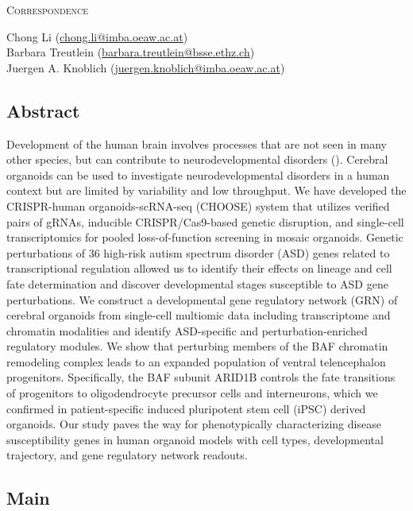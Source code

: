 \noindent
{\large\textsc{Correspondence}} 

\noindent
Chong Li (\href{mailto:chong.li@imba.oeaw.ac.at}{chong.li@imba.oeaw.ac.at})\\
Barbara Treutlein (\href{mailto:barbara.treutlein@bsse.ethz.ch}{barbara.treutlein@bsse.ethz.ch})\\
Juergen A. Knoblich (\href{mailto:juergen.knoblich@imba.oeaw.ac.at}{juergen.knoblich@imba.oeaw.ac.at})

\clearpage



\subsection{Abstract}
Development of the human brain involves processes that are not seen in many other species, but can contribute to neurodevelopmental disorders (\cite{hu_diverse_2014,klingler_mapping_2021,libe-philippot_cellular_2021,lui_development_2011}). Cerebral organoids can be used to investigate neurodevelopmental disorders in a human context but are limited by variability and low throughput. We have developed the CRISPR-human organoids-scRNA-seq (CHOOSE) system that utilizes verified pairs of gRNAs, inducible CRISPR/Cas9-based genetic disruption, and single-cell transcriptomics for pooled loss-of-function screening in mosaic organoids. Genetic perturbations of 36 high-risk autism spectrum disorder (ASD) genes related to transcriptional regulation allowed us to identify their effects on lineage and cell fate determination and discover developmental stages susceptible to ASD gene perturbations. We construct a developmental gene regulatory network (GRN) of cerebral organoids from single-cell multiomic data including transcriptome and chromatin modalities and identify ASD-specific and perturbation-enriched regulatory modules. We show that perturbing members of the BAF chromatin remodeling complex leads to an expanded population of ventral telencephalon progenitors. Specifically, the BAF subunit ARID1B controls the fate transitions of progenitors to oligodendrocyte precursor cells and interneurons, which we confirmed in patient-specific induced pluripotent stem cell (iPSC) derived organoids. Our study paves the way for phenotypically characterizing disease susceptibility genes in human organoid models with cell types, developmental trajectory, and gene regulatory network readouts.

\subsection{Main}

